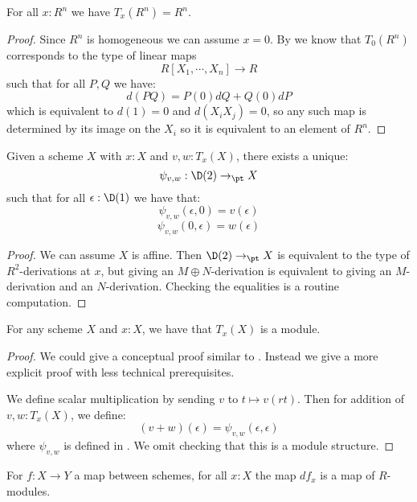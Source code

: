 \begin{lemma}\label{An-dimension-n}
For all $x:R^n$ we have $T_x(R^n) = R^n$.
\end{lemma}

\begin{proof}
Since $R^n$ is homogeneous we can assume $x=0$. By  we know that $T_0(R^n)$ corresponds to the type of linear maps
\[R[X_1,\cdots,X_n] \to R\]
such that for all $P,Q$ we have:
\[d(PQ) = P(0)dQ + Q(0)dP\]
which is equivalent to $d(1) = 0$ and $d(X_iX_j) = 0$, so any such map is determined by its image on the $X_i$ so it is equivalent to an element of $R^n$.
\end{proof}

\begin{lemma}\label{from-D1-to-D2}
Given a scheme $X$ with $x:X$ and $v,w:T_x(X)$, there exists a unique:
\[\psi_{v,w} : \D(2)\to_\pt X\]
such that for all $\epsilon:\D(1)$ we have that:
\[\psi_{v,w}(\epsilon,0) = v(\epsilon)\]
\[\psi_{v,w}(0,\epsilon) = w(\epsilon)\]
\end{lemma}

\begin{proof}
We can assume $X$ is affine. Then $\D(2)\to_\pt X$ is equivalent to the type of $R^2$-derivations at $x$, but giving an $M\oplus N$-derivation is equivalent to giving an $M$-derivation and an $N$-derivation. Checking the equalities is a routine computation.
\end{proof}

\begin{lemma}
For any scheme $X$ and $x:X$, we have that $T_x(X)$ is a module.
\end{lemma}

\begin{proof}
We could give a conceptual proof similar to \cite[Theorem 4.2.19]{david-orbifolds}. Instead we give a more explicit proof with less technical prerequisites.

We define scalar multiplication by sending $v$ to $t\mapsto v(rt)$. Then for addition of $v,w:T_x(X)$, we define:
\[(v+w)(\epsilon) = \psi_{v,w}(\epsilon,\epsilon)\]
where $\psi_{v,w}$ is defined in . We omit checking that this is a module structure.
\end{proof}

\begin{lemma}
For $f:X\to Y$ a map between schemes, for all $x:X$ the map $df_x$ is a map of $R$-modules.
\end{lemma}

